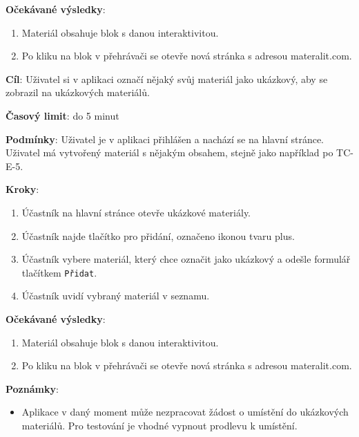 \textbf{Očekávané výsledky}:

\begin{enumerate}[leftmargin=1.4cm]
    \item Materiál obsahuje blok s danou interaktivitou.
    \item Po kliku na blok v přehrávači se otevře nová stránka s adresou materalit.com.
\end{enumerate}




\vspace{1em}

\textbf{Cíl}: Uživatel si v aplikaci označí nějaký svůj materiál jako ukázkový, aby se zobrazil na ukázkových materiálů.

\textbf{Časový limit}: do 5 minut

\textbf{Podmínky}:  Uživatel je v aplikaci přihlášen a nachází se na hlavní stránce.  Uživatel má vytvořený materiál s nějakým obsahem, stejně jako například po TC-E-5.

\textbf{Kroky}:

\begin{enumerate}[leftmargin=1.4cm]
    \item Účastník na hlavní stránce otevře ukázkové materiály.
    \item Účastník najde tlačítko pro přidání, označeno ikonou tvaru plus.
    \item Účastník vybere materiál, který chce označit jako ukázkový a odešle formulář tlačítkem \verb|Přidat|.
    \item Účastník uvidí vybraný materiál v seznamu.
\end{enumerate}

\textbf{Očekávané výsledky}:

\begin{enumerate}[leftmargin=1.4cm]
    \item Materiál obsahuje blok s danou interaktivitou.
    \item Po kliku na blok v přehrávači se otevře nová stránka s adresou materalit.com.
\end{enumerate}

\textbf{Poznámky}:

\begin{itemize}[leftmargin=1.4cm]
    \item Aplikace v daný moment může nezpracovat žádost o umístění do ukázkových materiálů. Pro testování je vhodné vypnout prodlevu k umístění.
\end{itemize}





